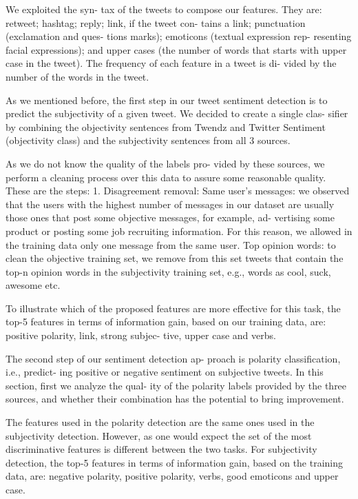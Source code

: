 We exploited the syn- tax of the tweets to compose our features. They
are: retweet; hashtag; reply; link, if the tweet con- tains a link;
punctuation (exclamation and ques- tions marks); emoticons (textual
expression rep- resenting facial expressions); and upper cases (the
number of words that starts with upper case in the tweet).  The
frequency of each feature in a tweet is di- vided by the number of the
words in the tweet.

As we mentioned before, the first step in our tweet sentiment
detection is to predict the subjectivity of a given tweet. We decided
to create a single clas- sifier by combining the objectivity sentences
from Twendz and Twitter Sentiment (objectivity class) and the
subjectivity sentences from all 3 sources.

As we do not know the quality of the labels pro- vided by these
sources, we perform a cleaning process over this data to assure some
reasonable quality. These are the steps: 1. Disagreement removal: Same
user's messages: we observed that the users with the highest number of
messages in our dataset are usually those ones that post some
objective messages, for example, ad- vertising some product or posting
some job recruiting information. For this reason, we allowed in the
training data only one message from the same user. Top opinion words:
to clean the objective training set, we remove from this set tweets
that contain the top-n opinion words in the subjectivity training set,
e.g., words as cool, suck, awesome etc.

To illustrate which of the proposed features are more effective for
this task, the top-5 features in terms of information gain, based on
our training data, are: positive polarity, link, strong subjec- tive,
upper case and verbs.

The second step of our sentiment detection ap- proach is polarity
classification, i.e., predict- ing positive or negative sentiment on
subjective tweets. In this section, first we analyze the qual- ity of
the polarity labels provided by the three sources, and whether their
combination has the potential to bring improvement.

The features used in the polarity detection are the same ones used in
the subjectivity detection.  However, as one would expect the set of
the most discriminative features is different between the two
tasks. For subjectivity detection, the top-5 features in terms of
information gain, based on the training data, are: negative polarity,
positive polarity, verbs, good emoticons and upper case.


